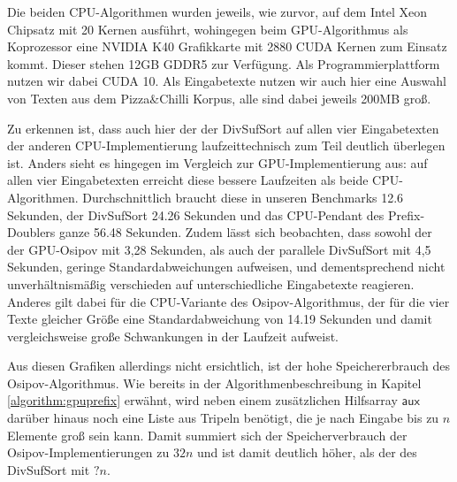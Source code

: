 Die beiden CPU-Algorithmen wurden jeweils, wie zurvor, auf dem Intel\textsuperscript{\textregistered} Xeon\textsuperscript{\textregistered} Chipsatz mit 20 Kernen ausführt, wohingegen beim GPU-Algorithmus als Koprozessor eine NVIDIA\textsuperscript{\textregistered} K40 Grafikkarte mit 2880 CUDA Kernen zum Einsatz kommt. Dieser stehen 12GB GDDR5 zur Verfügung. Als Programmierplattform nutzen wir dabei CUDA 10. Als Eingabetexte nutzen wir auch hier eine Auswahl von Texten aus dem Pizza$\&$Chilli Korpus, alle sind dabei jeweils 200MB groß.

Zu erkennen ist, dass auch hier der der DivSufSort auf allen vier Eingabetexten der anderen CPU-Implementierung laufzeittechnisch zum Teil deutlich überlegen ist. Anders sieht es hingegen im Vergleich zur GPU-Implementierung aus: auf allen vier Eingabetexten erreicht diese bessere Laufzeiten als beide CPU-Algorithmen. Durchschnittlich braucht diese in unseren Benchmarks 12.6 Sekunden, der DivSufSort 24.26 Sekunden und das CPU-Pendant des Prefix-Doublers ganze 56.48 Sekunden. 
Zudem lässt sich beobachten, dass sowohl der der GPU-Osipov mit 3,28 Sekunden, als auch der parallele DivSufSort mit 4,5 Sekunden, geringe Standardabweichungen aufweisen, und dementsprechend nicht unverhältnismäßig verschieden auf unterschiedliche Eingabetexte reagieren. Anderes gilt dabei für die CPU-Variante des Osipov-Algorithmus, der für die vier Texte gleicher Größe eine Standardabweichung von 14.19 Sekunden und damit vergleichsweise große Schwankungen in der Laufzeit aufweist.

Aus diesen Grafiken allerdings nicht ersichtlich, ist der hohe Speichererbrauch des Osipov-Algorithmus. Wie bereits in der Algorithmenbeschreibung in Kapitel \ref{algorithm:gpuprefix} erwähnt, wird neben einem zusätzlichen Hilfsarray $\mathsf{aux}$ darüber hinaus noch eine Liste aus Tripeln benötigt, die je nach Eingabe bis zu $n$ Elemente groß sein kann. Damit summiert sich der Speicherverbrauch der Osipov-Implementierungen zu $32n$ und ist damit deutlich höher, als der des DivSufSort mit $?n$.

